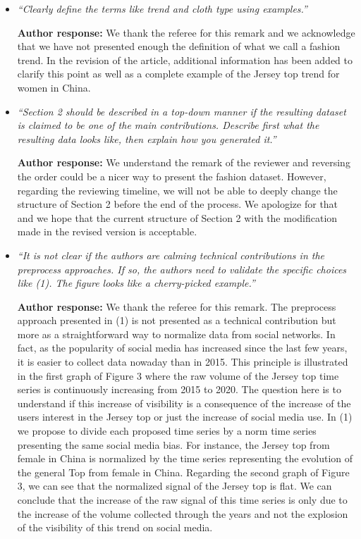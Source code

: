 \documentclass[10pt]{article} %
\begin{document}
\begin{itemize}
	\item {\em ``Clearly define the terms like trend and cloth type using examples.''} \medskip
	
	\textbf{Author response:} We thank the referee for this remark and we acknowledge that we have not presented enough the definition of what we call a fashion trend. In the revision of the article, additional information has been added to clarify this point as well as a complete example of the Jersey top trend for women in China.\\
	
	\item {\em ``Section 2 should be described in a top-down manner if the resulting dataset is claimed to be one of the main contributions. Describe first what the resulting data looks like, then explain how you generated it.''} \medskip
	
	\textbf{Author response:} We understand the remark of the reviewer and reversing the order could be a nicer way to present the fashion dataset. However, regarding the reviewing timeline, we will not be able to deeply change the structure of Section 2 before the end of the process. We apologize for that and we hope that the current structure of Section 2 with the modification made in the revised version is acceptable.\\
	
	\item {\em ``It is not clear if the authors are calming technical contributions in the preprocess approaches. If so, the authors need to validate the specific choices like (1). The figure looks like a cherry-picked example.''} \medskip
	
	\textbf{Author response:} We thank the referee for this remark. The preprocess approach presented in (1) is not presented as a technical contribution but more as a straightforward way to normalize data from social networks. In fact, as the popularity of social media has increased since the last few years, it is easier to collect data nowaday than in 2015. This principle is illustrated in the first graph of Figure 3 where the raw volume of the Jersey top time series is continuously increasing from 2015 to 2020. The question here is to understand if this increase of visibility is a consequence of the increase of the users interest in the Jersey top or just the increase of social media use. In (1) we propose to divide each proposed time series by a norm time series presenting the same social media bias. For instance, the Jersey top from female in China is normalized by the time series representing the evolution of the general Top from female in China. Regarding the second graph of Figure 3, we can see that the normalized signal of the Jersey top is flat. We can conclude that the increase of the raw signal of this time series is only due to the increase of the volume collected through the years and not the explosion of the visibility of this trend on social media.\\
	

\end{itemize}
\end{document}
